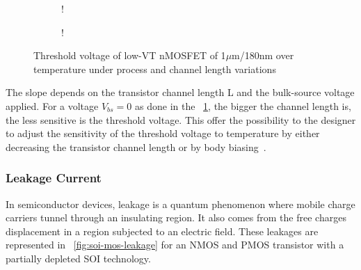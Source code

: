 \begin{figure}[!ht]
	\centering
	\begin{subfigure}[b]{0.48\textwidth}
		\resizebox {\textwidth} {!} { 
			
		}
	\end{subfigure}
	\begin{subfigure}[b]{0.48\textwidth}
		\resizebox {\textwidth} {!} { 
			
		}
		\label{fig:vth_nel_L}
	\end{subfigure}
	\caption{Threshold voltage of low-VT nMOSFET of 1\(\mu \)m/180nm over temperature under process and channel length variations}
	\label{fig:vth_nel}
\end{figure}

The slope depends on the transistor channel length L and the bulk-source voltage applied. For a voltage \(V_{bs} = 0 \) as done in the \figurename~\ref{fig:vth_nel_L}, the bigger the channel length is, the less sensitive is the threshold voltage. This offer the possibility to the designer to adjust the sensitivity of the threshold voltage to temperature by either decreasing the transistor channel length or by body biasing~\cite{Kumar2008}.


\subsubsection{Leakage Current}        %
In semiconductor devices, leakage is a quantum phenomenon where mobile charge carriers tunnel through an insulating region. It also comes from the free charges displacement in a region subjected to an electric field. These leakages are represented in \figurename~\ref{fig:soi-mos-leakage} for an NMOS and PMOS transistor with a partially depleted SOI technology.

